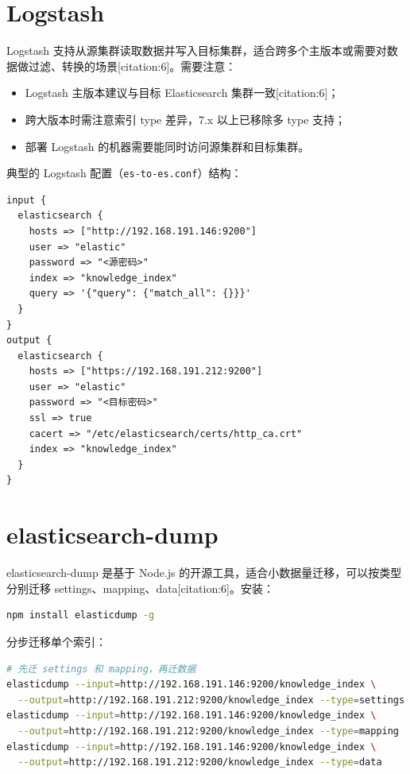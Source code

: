 \documentclass[11pt,a4paper,openany]{ctexbook}
\begin{document}
\section{Logstash}

Logstash 支持从源集群读取数据并写入目标集群，适合跨多个主版本或需要对数据做过滤、转换的场景[citation:6]。需要注意：

\begin{itemize}[leftmargin=1.4em]
  \item Logstash 主版本建议与目标 Elasticsearch 集群一致[citation:6]；
  \item 跨大版本时需注意索引 type 差异，7.x 以上已移除多 type 支持；
  \item 部署 Logstash 的机器需要能同时访问源集群和目标集群。
\end{itemize}

典型的 Logstash 配置（\texttt{es-to-es.conf}）结构：

\begin{lstlisting}
input {
  elasticsearch {
    hosts => ["http://192.168.191.146:9200"]
    user => "elastic"
    password => "<源密码>"
    index => "knowledge_index"
    query => '{"query": {"match_all": {}}}'
  }
}
output {
  elasticsearch {
    hosts => ["https://192.168.191.212:9200"]
    user => "elastic"
    password => "<目标密码>"
    ssl => true
    cacert => "/etc/elasticsearch/certs/http_ca.crt"
    index => "knowledge_index"
  }
}
\end{lstlisting}

\section{elasticsearch-dump}

elasticsearch-dump 是基于 Node.js 的开源工具，适合小数据量迁移，可以按类型分别迁移 settings、mapping、data[citation:6]。安装：

\begin{lstlisting}[language=bash]
npm install elasticdump -g
\end{lstlisting}

分步迁移单个索引：

\begin{lstlisting}[language=bash]
# 先迁 settings 和 mapping，再迁数据
elasticdump --input=http://192.168.191.146:9200/knowledge_index \
  --output=http://192.168.191.212:9200/knowledge_index --type=settings
elasticdump --input=http://192.168.191.146:9200/knowledge_index \
  --output=http://192.168.191.212:9200/knowledge_index --type=mapping
elasticdump --input=http://192.168.191.146:9200/knowledge_index \
  --output=http://192.168.191.212:9200/knowledge_index --type=data
\end{lstlisting}
\end{document}
